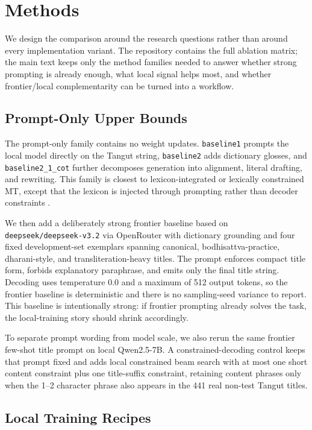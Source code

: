 \section{Methods}

We design the comparison around the research questions rather than around every implementation variant. The repository contains the full ablation matrix; the main text keeps only the method families needed to answer whether strong prompting is already enough, what local signal helps most, and whether frontier/local complementarity can be turned into a workflow.

\subsection{Prompt-Only Upper Bounds}

The prompt-only family contains no weight updates. \texttt{baseline1} prompts the local model directly on the Tangut string, \texttt{baseline2} adds dictionary glosses, and \texttt{baseline2\_1\_cot} further decomposes generation into alignment, literal drafting, and rewriting. This family is closest to lexicon-integrated or lexically constrained MT, except that the lexicon is injected through prompting rather than decoder constraints \cite{arthur2016lexicons, hokamp2017lexically}.

We then add a deliberately strong frontier baseline based on \texttt{deepseek/deepseek-v3.2} via OpenRouter with dictionary grounding and four fixed development-set exemplars spanning canonical, bodhisattva-practice, dharani-style, and transliteration-heavy titles. The prompt enforces compact title form, forbids explanatory paraphrase, and emits only the final title string. Decoding uses temperature 0.0 and a maximum of 512 output tokens, so the frontier baseline is deterministic and there is no sampling-seed variance to report. This baseline is intentionally strong: if frontier prompting already solves the task, the local-training story should shrink accordingly.

To separate prompt wording from model scale, we also rerun the same frontier few-shot title prompt on local Qwen2.5-7B. A constrained-decoding control keeps that prompt fixed and adds local constrained beam search with at most one short content constraint plus one title-suffix constraint, retaining content phrases only when the 1--2 character phrase also appears in the 441 real non-test Tangut titles.

\subsection{Local Training Recipes}

